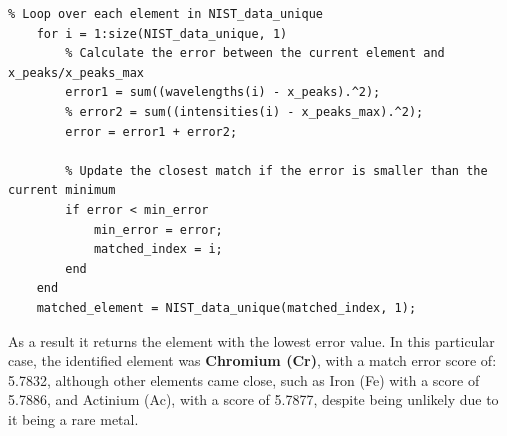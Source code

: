 \begin{lstlisting}
% Loop over each element in NIST_data_unique
    for i = 1:size(NIST_data_unique, 1)
        % Calculate the error between the current element and x_peaks/x_peaks_max
        error1 = sum((wavelengths(i) - x_peaks).^2);
        % error2 = sum((intensities(i) - x_peaks_max).^2);
        error = error1 + error2;
        
        % Update the closest match if the error is smaller than the current minimum
        if error < min_error
            min_error = error;
            matched_index = i;
        end
    end
    matched_element = NIST_data_unique(matched_index, 1);
\end{lstlisting}

As a result it returns the element with the lowest error value.
In this particular case, the identified element was \textbf{Chromium (Cr)}, with a match error score of: 5.7832, although other elements came close, such as Iron (Fe) with a score of 5.7886, and Actinium (Ac), with a score of 5.7877, despite being unlikely due to it being a rare metal.
